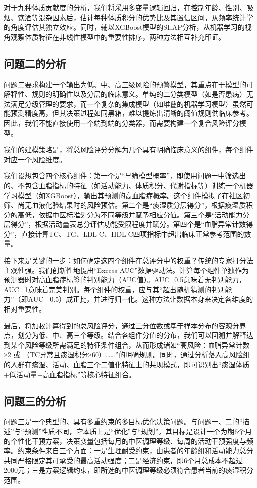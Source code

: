 \documentclass[12pt,a4paper]{ctexart}
\begin{document}
对于九种体质贡献度的分析，我们将采用多变量逻辑回归，在控制年龄、性别、吸烟、饮酒等混杂因素后，估计每种体质积分的优势比及其置信区间，从频率统计学的角度评估其独立效应。同时，辅以XGBoost模型的SHAP分析，从机器学习的视角观察体质特征在非线性模型中的重要性排序，两种方法相互补充印证。
\subsection{问题二的分析}
问题二要求构建一个输出为低、中、高三级风险的预警模型，其重点在于模型的可解释性、规则的明确性以及分层的临床意义。单纯的二分类模型（如是否患病）无法满足分级管理的要求，而一个复杂的集成模型（如堆叠的机器学习模型）虽然可能预测精度高，但其决策过程如同黑箱，难以提炼出清晰的阈值规则供临床参考。因此，我们不能直接使用一个端到端的分类器，而需要构建一个复合风险评分模型。

我们的建模策略是，将总风险评分分解为几个具有明确临床意义的组件，每个组件对应一个风险维度。

我们设想包含四个核心组件：第一个是“早筛模型概率”，即使用问题一中筛选出的、不包含血脂指标的特征（如活动能力、体质积分、代谢指标等）训练一个机器学习模型（如XGBoost），输出其预测的高血脂症概率。这个组件模拟了在社区初筛、尚无血液化验结果时的风险预估。第二个是“痰湿质分层得分”，根据痰湿质积分的高低，依据中医标准划分为不同等级并赋予相应分值。第三个是“活动能力分层得分”，根据活动量表总分评估功能受限程度并赋分。第四个是“血脂异常计数得分”，直接计算TC、TG、LDL-C、HDL-C四项指标中超出临床正常参考范围的数量。

接下来是关键的一步：如何确定这四个组件在总评分中的权重？传统的专家打分法主观性强。我们创新性地提出“Excess-AUC”数据驱动法。计算每个组件单独作为预测器时对高血脂症标签的判别能力（AUC值）。AUC=0.5意味着无判别能力，AUC=1意味着完美判别。每个组件的权重，应与其“超出随机猜测的判别能力”（即AUC - 0.5）成正比，并进行归一化。这种方法让数据本身来决定各维度的相对重要性。

最后，将加权计算得到的总风险评分，通过三分位数或基于样本分布的客观分界点，划分为低、中、高三个等级。结合各组件分值的分布，我们可以回溯并解释达到某个风险等级所需满足的特征条件组合，从而形成诸如“高风险：血脂异常计数≥2 或 （TC异常且痰湿积分≥60）……”的明确规则。同时，通过分析落入高风险组的人群在痰湿、活动、血脂三个二值化特征上的共现模式，即可识别出“痰湿体质+低活动量+高血脂指标”等核心特征组合。
\subsection{问题三的分析}
问题三是一个典型的、具有多重约束的多目标优化决策问题。与问题一、二的“描述”与“预测”性质不同，它本质上是“优化”与“规划”。其目标是设计一个为期6个月的个性化干预方案，决策变量包括每月的中医调理等级、每周的活动干预强度与频率。约束条件来自三个方面：一是生理耐受约束，由患者的年龄组和活动能力总分共同严格限定其可承受的最高活动强度；二是经济约束，即6个月总成本不超过2000元；三是方案逻辑约束，即所选的中医调理等级必须符合患者当前的痰湿积分范围。
\end{document}

